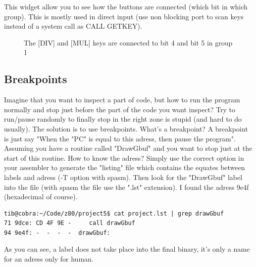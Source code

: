 \documentclass[10pt]{report}
\newcommand{\calckey}[1]{\textsf{[#1]}}
\begin{document}
This widget allow you to see how the buttons are connected (which bit in which group).\newline
This is mostly used in direct input (use non blocking port to scan keys instead of a system call as CALL GETKEY).\newline

\begin{figure}[H]
\centering
{}
\caption{The \calckey{DIV} and \calckey{MUL} keys are connected to bit 4 and bit 5 in group 1}
\end{figure}

\subsection{Breakpoints}

Imagine that you want to inspect a part of code, but how to run the program normally and stop just before the part of the code you want inspect?\newline
Try to run/pause randomly to finally stop in the right zone is stupid (and hard to do usually).\newline
The solution is to use breakpoints.\newline
What's a breakpoint?\newline
A breakpoint is just say "When the "PC" is equal to this adress, then pause the program".\newline
Assuming you have a routine called "DrawGbuf" and you want to stop just at the start of this routine.\newline
How to know the adress?\newline
Simply use the correct option in your assembler to generate the "listing" file which contains the equates between labels and adress (-T option with spasm).\newline
Then look for the "DrawGbuf" label into the file (with spasm the file use the ".lst" extension).\newline
I found the adress 9e4f (hexadecimal of course).\newline
\begin{lstlisting}
tib@cobra:~/Code/z80/project5$ cat project.lst | grep drawGbuf
71 9dce: CD 4F 9E -  	call drawGbuf
94 9e4f: -  -  -  -  drawGbuf:
\end{lstlisting}
As you can see, a label does not take place into the final binary, it's only a name for an adress only for human.\newline
\end{document}
